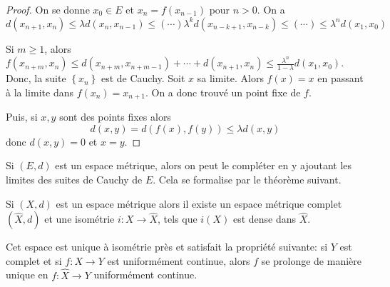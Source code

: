 \begin{proof}
    On se donne $x_0\in E$ et $x_n=f(x_{n-1})$ pour $n>0$. On a  \[ d(x_{n+1}, x_n)\leq \lambda d(x_n, x_{n-1})\leq (\cdots ) \lambda^k d(x_{n-k+1}, x_{n-k}) \leq (\cdots ) \leq \lambda^n d(x_1, x_0)\]

    Si $m\geq 1$, alors $f(x_{n+m}, x_n)\leq d(x_{n+m}, x_{n+m-1})+\cdots +d(x_{n+1}, x_n)\leq \frac{\lambda^n}{1-\lambda}d(x_1, x_0)$. Donc, la suite $\left\{ x_n \right\} $ est de Cauchy. Soit $x$ sa limite. Alors  $f(x)=x$ en passant à la limite dans $f(x_n)=x_{n+1}$. On a donc trouvé un point fixe de $f$. 

    Puis, si $x, y$ sont des points fixes alors  \[
        d(x, y)=d(f(x), f(y))\leq \lambda d(x, y)
    \] 
    donc $d(x, y)=0$ et  $x=y$.
\end{proof}

Si $(E, d)$ est un espace métrique, alors on peut le compléter en y ajoutant les limites des suites de Cauchy de  $E$. Cela se formalise par le théorème suivant.

\begin{thm}
    Si $(X, d)$ est un espace métrique alors il existe un espace métrique complet  $(\hat{X}, d)$ et une isométrie $i:X \longrightarrow  \hat{X}$, tels que $i(X)$ est dense dans $\hat{X}$.

    Cet espace est unique à isométrie près et satisfait la propriété suivante: si $Y$ est complet et si  $f:X \longrightarrow Y$ est uniformément continue, alors $f$ se prolonge de manière unique en  $f:\hat{X}\longrightarrow Y$ uniformément continue.
\end{thm}

